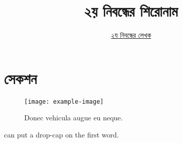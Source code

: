 \documentclass[12pt]{article}
\begin{document}

\title{২য় নিবন্ধের শিরোনাম}
\author{\href{https://github.com/rafisics/ebook-template}{২য় নিবন্ধের লেখক}}
\date{}


\section{সেকশন}

\begin{figure}[hbt!]
        \centering
        \texttt{[image: example-image]}
        \caption{Donec vehicula augue eu neque.}
\end{figure}

 can put a drop-cap on the first word.
\lipsum



\end{document}

